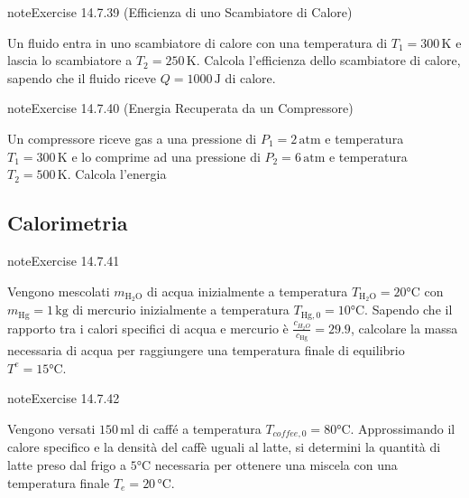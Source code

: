 \documentclass[letterpaper,10pt,italian]{jupyterBook}
\begin{document}
\begin{sphinxadmonition}{note}{Exercise 14.7.39 (Efficienza di uno Scambiatore di Calore)}



\sphinxAtStartPar
Un fluido entra in uno scambiatore di calore con una temperatura di \(T_1 = 300 \, \text{K}\) e lascia lo scambiatore a \(T_2 = 250 \, \text{K}\). Calcola l’efficienza dello scambiatore di calore, sapendo che il fluido riceve \(Q = 1000 \, \text{J}\) di calore.
\end{sphinxadmonition}
 \label{exercise:ch/thermodynamics/principles-problems-exercise-39}

\begin{sphinxadmonition}{note}{Exercise 14.7.40 (Energia Recuperata da un Compressore)}



\sphinxAtStartPar
Un compressore riceve gas a una pressione di \(P_1 = 2 \, \text{atm}\) e temperatura \(T_1 = 300 \, \text{K}\) e lo comprime ad una pressione di \(P_2 = 6 \, \text{atm}\) e temperatura \(T_2 = 500 \, \text{K}\). Calcola l’energia
\end{sphinxadmonition}


\subsection{Calorimetria}
\label{\detokenize{ch/thermodynamics/principles-problems:calorimetria}} \label{exercise:ch/thermodynamics/principles-problems-exercise-40}

\begin{sphinxadmonition}{note}{Exercise 14.7.41}



\sphinxAtStartPar
Vengono mescolati \(m_{\text{H}_2\text{O}}\) di acqua inizialmente a temperatura \(T_{\text{H}_2\text{O}} = 20 \text{°C}\) con \(m_{\text{Hg}} = 1 \, \text{kg}\) di mercurio inizialmente a temperatura \(T_{\text{Hg},0} = 10 \text{°C}\). Sapendo che il rapporto tra i calori specifici di acqua e mercurio è \(\frac{c_{H_2 O}}{c_{\text{Hg}}} = 29.9\), calcolare la massa necessaria di acqua per raggiungere una temperatura finale di equilibrio \(T^{e} = 15 \text{°C}\).
\end{sphinxadmonition}
 \label{exercise:ch/thermodynamics/principles-problems-exercise-41}

\begin{sphinxadmonition}{note}{Exercise 14.7.42}



\sphinxAtStartPar
Vengono versati \(150 \, \text{ml}\) di caffé a temperatura \(T_{coffee,0} = 80 \text{°C}\). Approssimando il calore specifico e la densità del caffè uguali al latte, si determini la quantità di latte preso dal frigo a \(5 \text{°C}\) necessaria per ottenere una miscela con una temperatura finale \(T_e = 20 \, \text{°C}\).
\end{sphinxadmonition}
 \label{exercise:ch/thermodynamics/principles-problems-exercise-42}
\end{document}
